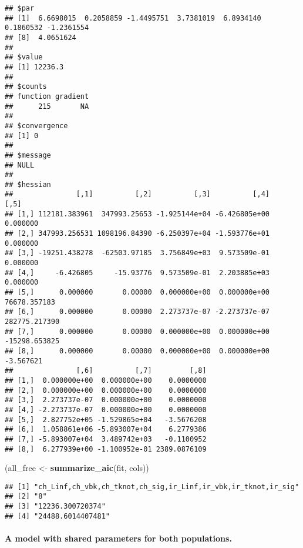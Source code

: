 \documentclass[
]{article}
\newenvironment{Shaded}{\begin{snugshade}}{\end{snugshade}}
\newcommand{\KeywordTok}[1]{\textcolor[rgb]{0.13,0.29,0.53}{\textbf{#1}}}
\newcommand{\NormalTok}[1]{#1}
\newcommand{\StringTok}[1]{\textcolor[rgb]{0.31,0.60,0.02}{#1}}
\begin{document}
\begin{verbatim}
## $par
## [1]  6.6698015  0.2058859 -1.4495751  3.7381019  6.8934140  0.1860532 -1.2361554
## [8]  4.0651624
## 
## $value
## [1] 12236.3
## 
## $counts
## function gradient 
##      215       NA 
## 
## $convergence
## [1] 0
## 
## $message
## NULL
## 
## $hessian
##               [,1]          [,2]          [,3]          [,4]          [,5]
## [1,] 112181.383961  347993.25653 -1.925144e+04 -6.426805e+00      0.000000
## [2,] 347993.256531 1098196.84390 -6.250397e+04 -1.593776e+01      0.000000
## [3,] -19251.438278  -62503.97185  3.756849e+03  9.573509e-01      0.000000
## [4,]     -6.426805     -15.93776  9.573509e-01  2.203885e+03      0.000000
## [5,]      0.000000       0.00000  0.000000e+00  0.000000e+00  76678.357183
## [6,]      0.000000       0.00000  2.273737e-07 -2.273737e-07 282775.217390
## [7,]      0.000000       0.00000  0.000000e+00  0.000000e+00 -15298.653825
## [8,]      0.000000       0.00000  0.000000e+00  0.000000e+00     -3.567621
##               [,6]          [,7]         [,8]
## [1,]  0.000000e+00  0.000000e+00    0.0000000
## [2,]  0.000000e+00  0.000000e+00    0.0000000
## [3,]  2.273737e-07  0.000000e+00    0.0000000
## [4,] -2.273737e-07  0.000000e+00    0.0000000
## [5,]  2.827752e+05 -1.529865e+04   -3.5676208
## [6,]  1.058861e+06 -5.893007e+04    6.2779386
## [7,] -5.893007e+04  3.489742e+03   -0.1100952
## [8,]  6.277939e+00 -1.100952e-01 2389.0876109
\end{verbatim}

\begin{Shaded}
\begin{Highlighting}[]
\NormalTok{(all\_free \textless{}{-}}\StringTok{ }\KeywordTok{summarize\_aic}\NormalTok{(fit, cols))}
\end{Highlighting}
\end{Shaded}

\begin{verbatim}
## [1] "ch_Linf,ch_vbk,ch_tknot,ch_sig,ir_Linf,ir_vbk,ir_tknot,ir_sig"
## [2] "8"                                                            
## [3] "12236.300720374"                                              
## [4] "24488.6014407481"
\end{verbatim}

\hypertarget{a-model-with-shared-parameters-for-both-populations.}{%
\paragraph{A model with shared parameters for both
populations.}\label{a-model-with-shared-parameters-for-both-populations.}}
\end{document}
